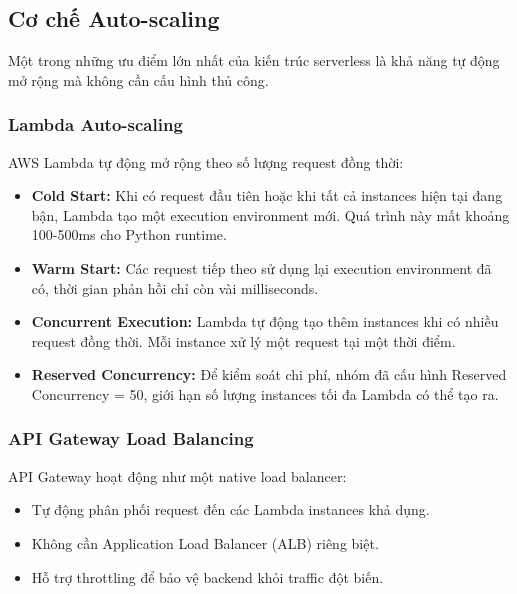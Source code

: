 \subsection{Cơ chế Auto-scaling}
\label{ssec:autoscaling}

Một trong những ưu điểm lớn nhất của kiến trúc serverless là khả năng tự động mở rộng mà không cần cấu hình thủ công.

\subsubsection{Lambda Auto-scaling}

AWS Lambda tự động mở rộng theo số lượng request đồng thời:

\begin{itemize}
    \item \textbf{Cold Start:} Khi có request đầu tiên hoặc khi tất cả instances hiện tại đang bận, Lambda tạo một execution environment mới. Quá trình này mất khoảng 100-500ms cho Python runtime.
    
    \item \textbf{Warm Start:} Các request tiếp theo sử dụng lại execution environment đã có, thời gian phản hồi chỉ còn vài milliseconds.
    
    \item \textbf{Concurrent Execution:} Lambda tự động tạo thêm instances khi có nhiều request đồng thời. Mỗi instance xử lý một request tại một thời điểm.
    
    \item \textbf{Reserved Concurrency:} Để kiểm soát chi phí, nhóm đã cấu hình Reserved Concurrency = 50, giới hạn số lượng instances tối đa Lambda có thể tạo ra.
\end{itemize}

\subsubsection{API Gateway Load Balancing}

API Gateway hoạt động như một native load balancer:

\begin{itemize}
    \item Tự động phân phối request đến các Lambda instances khả dụng.
    \item Không cần Application Load Balancer (ALB) riêng biệt.
    \item Hỗ trợ throttling để bảo vệ backend khỏi traffic đột biến.
\end{itemize}

